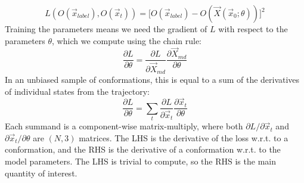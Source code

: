 \documentclass{article}
\begin{document}
\begin{equation}
L(O(\vec{x}_{label}), O(\vec{x}_t)) = \lbrack O(\vec{x}_{label}) - O(\vec{X}(\vec{x}_0;\theta)) \rbrack ^2
\end{equation}
Training the parameters means we need the gradient of $L$ with respect to the parameters $\theta$, which we compute using the chain rule:
\begin{equation}
\dfrac {\partial L}{\partial \theta} = \dfrac{\partial L}{\partial \vec{X}_{md}} \dfrac{\partial \vec{X}_{md}}{\partial \theta}
\end{equation}
In an unbiased sample of conformations, this is equal to a sum of the derivatives of individual states from the trajectory:
\begin{equation}
\dfrac {\partial L}{\partial \theta} = \sum_{t}{\dfrac{\partial L}{\partial \vec{x}_t} \dfrac{\partial \vec{x}_t}{\partial \theta}}
\end{equation}
Each summand is a component-wise matrix-multiply, where both $\partial L / \partial \vec{x}_t$ and ${\partial \vec{x}_t}/{\partial \theta}$ are $(N, 3)$ matrices. The LHS is the derivative of the loss w.r.t. to a conformation, and the RHS is the derivative of a conformation w.r.t. to the model parameters. The LHS is trivial to compute, so the RHS is the main quantity of interest.
\end{document}
